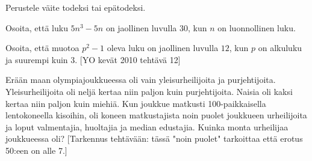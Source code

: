 \begin{kotitehtavasivu}
\begin{tehtava}

    \begin{vastaus}
    \end{vastaus}
    
\end{tehtava}

\begin{tehtava}
    Perustele väite todeksi tai epätodeksi.

    \begin{vastaus}
    \end{vastaus}
    
\end{tehtava}

\begin{tehtava}
    Osoita, että luku $5n^3 - 5n$ on jaollinen luvulla $30$, kun $n$ on luonnollinen luku.
\end{tehtava}

\begin{tehtava}
    Osoita, että muotoa $p^2 - 1$ oleva luku on jaollinen luvulla $12$, kun $p$ on alkuluku ja suurempi kuin $3$. [YO kevät 2010 tehtävä 12]
\end{tehtava}

\begin{tehtava}
    Erään maan olympiajoukkueessa oli vain yleisurheilijoita ja
    purjehtijoita. Yleisurheilijoita oli neljä kertaa niin paljon kuin
    purjehtijoita. Naisia oli kaksi kertaa niin paljon kuin miehiä.
    Kun joukkue matkusti 100-paikkaisella lentokoneella kisoihin,
    oli koneen matkustajista noin puolet joukkueen urheilijoita ja
    loput valmentajia, huoltajia ja median edustajia. Kuinka monta
    urheilijaa joukkueessa oli? [Tarkennus tehtävään: tässä "noin puolet" tarkoittaa että erotus 50:een on alle 7.] %
    

\end{tehtava}
\end{kotitehtavasivu}

